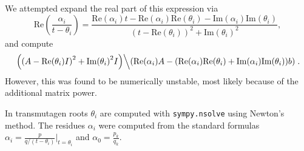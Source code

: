 We attempted expand the real part of this expression via
\begin{equation}
\mathrm{Re}\left(\frac{\alpha_i}{t - \theta_i}\right) = \frac{\mathrm{Re}{(\alpha_{i})}t - \mathrm{Re}{(\alpha_{i})} \mathrm{Re}{(\theta_{i})} - \mathrm{Im}{(\alpha_{i})} \mathrm{Im}{(\theta_{i})}}{\left(t - \mathrm{Re}{(\theta_{i})}\right)^{2} + \mathrm{Im}{(\theta_{i})}^{2}},
\end{equation}
and compute
\begin{equation}
  \left.\left(\left(A - \mathrm{Re}{(\theta_{i})I}\right)^{2} +
  \mathrm{Im}{(\theta_{i})}^{2}I\right)\middle\backslash \left(\mathrm{Re}{(\alpha_{i})}A - (\mathrm{Re}{(\alpha_{i})} \mathrm{Re}{(\theta_{i})} + \mathrm{Im}{(\alpha_{i})} \mathrm{Im}{(\theta_{i})})b\right)\right..
\end{equation}
However, this was found to be numerically unstable, most likely because of the
additional matrix power. %

In transmutagen roots $\theta_i$ are computed with
\texttt{sympy.\allowbreak{}nsolve} using Newton's method. The residues
$\alpha_i$ were computed from the standard formulas
$\alpha_i = \frac{p}{q/(t - \theta_i)}|_{t=\theta_i}$ and
$\alpha_0=\frac{p_k}{q_k}$.

